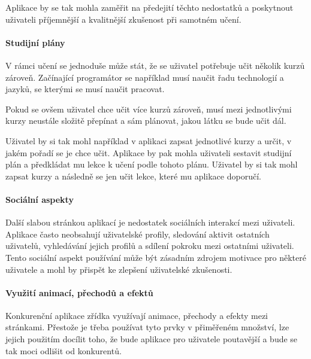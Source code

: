 Aplikace by se tak mohla zaměřit na předejití těchto nedostatků a poskytnout uživateli příjemnější a kvalitnější zkušenost při samotném učení.

\paragraph{Studijní plány}

V rámci učení se jednoduše může stát, že se uživatel potřebuje učit několik kurzů zároveň. Začínající programátor se například musí naučit řadu technologií a jazyků, se kterými se musí naučit pracovat.

Pokud se ovšem uživatel chce učit více kurzů zároveň, musí mezi jednotlivými kurzy neustále složitě přepínat a sám plánovat, jakou látku se bude učit dál.

Uživatel by si tak mohl například v aplikaci zapsat jednotlivé kurzy a určit, v jakém pořadí se je chce učit. Aplikace by pak mohla uživateli sestavit studijní plán a předkládat mu lekce k učení podle tohoto plánu. Uživatel by si tak mohl zapsat kurzy a následně se jen učit lekce, které mu aplikace doporučí.

\paragraph{Sociální aspekty}

Další slabou stránkou aplikací je nedostatek sociálních interakcí mezi uživateli. Aplikace často neobsahují uživatelské profily, sledování aktivit ostatních uživatelů, vyhledávání jejich profilů a sdílení pokroku mezi ostatními uživateli. Tento sociální aspekt používání může být zásadním zdrojem motivace pro některé uživatele a mohl by přispět ke zlepšení uživatelské zkušenosti.

\paragraph{Využití animací, přechodů a efektů}

Konkurenční aplikace zřídka využívají animace, přechody a efekty mezi stránkami. Přestože je třeba používat tyto prvky v přiměřeném množství, lze jejich použitím docílit toho, že bude aplikace pro uživatele poutavější a bude se tak moci odlišit od konkurentů.
